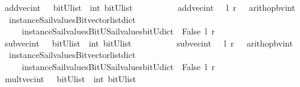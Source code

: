 \begin{isabellebody}
{}\isanewline
%
\isanewline
{}\isamarkupfalse%
\ add{\isacharunderscore}vec{\isacharunderscore}int\ \ {\isacharcolon}{\isacharcolon}\ {\isachardoublequoteopen}{\isacharparenleft}bitU{\isacharparenright}list\ {\isasymRightarrow}\ int\ {\isasymRightarrow}{\isacharparenleft}bitU{\isacharparenright}list\ {\isachardoublequoteclose}\ \ \ \isanewline
\ \ \ \ \ {\isachardoublequoteopen}\ add{\isacharunderscore}vec{\isacharunderscore}int\ \ \ l\ r\ {\isacharequal}\ {\isacharparenleft}\ arith{\isacharunderscore}op{\isacharunderscore}bv{\isacharunderscore}int\ \isanewline
\ \ {\isacharparenleft}instance{\isacharunderscore}Sail{}{\isacharunderscore}values{\isacharunderscore}Bitvector{\isacharunderscore}list{\isacharunderscore}dict\isanewline
\ \ \ \ \ instance{\isacharunderscore}Sail{}{\isacharunderscore}values{\isacharunderscore}BitU{\isacharunderscore}Sail{}{\isacharunderscore}values{\isacharunderscore}bitU{\isacharunderscore}dict{\isacharparenright}\ {\isacharparenleft}{\isacharplus}{\isacharparenright}\ False\ l\ r\ {\isacharparenright}{\isachardoublequoteclose}\isanewline
\isanewline
{}\isamarkupfalse%
\ sub{\isacharunderscore}vec{\isacharunderscore}int\ \ {\isacharcolon}{\isacharcolon}\ {\isachardoublequoteopen}{\isacharparenleft}bitU{\isacharparenright}list\ {\isasymRightarrow}\ int\ {\isasymRightarrow}{\isacharparenleft}bitU{\isacharparenright}list\ {\isachardoublequoteclose}\ \ \ \isanewline
\ \ \ \ \ {\isachardoublequoteopen}\ sub{\isacharunderscore}vec{\isacharunderscore}int\ \ \ l\ r\ {\isacharequal}\ {\isacharparenleft}\ arith{\isacharunderscore}op{\isacharunderscore}bv{\isacharunderscore}int\ \isanewline
\ \ {\isacharparenleft}instance{\isacharunderscore}Sail{}{\isacharunderscore}values{\isacharunderscore}Bitvector{\isacharunderscore}list{\isacharunderscore}dict\isanewline
\ \ \ \ \ instance{\isacharunderscore}Sail{}{\isacharunderscore}values{\isacharunderscore}BitU{\isacharunderscore}Sail{}{\isacharunderscore}values{\isacharunderscore}bitU{\isacharunderscore}dict{\isacharparenright}\ {\isacharparenleft}{\isacharminus}{\isacharparenright}\ False\ l\ r\ {\isacharparenright}{\isachardoublequoteclose}\isanewline
\isanewline
{}\isamarkupfalse%
\ mult{\isacharunderscore}vec{\isacharunderscore}int\ \ {\isacharcolon}{\isacharcolon}\ {\isachardoublequoteopen}{\isacharparenleft}bitU{\isacharparenright}list\ {\isasymRightarrow}\ int\ {\isasymRightarrow}{\isacharparenleft}bitU{\isacharparenright}list\ {\isachardoublequoteclose}\ \ \ \isanewline

\end{isabellebody}
